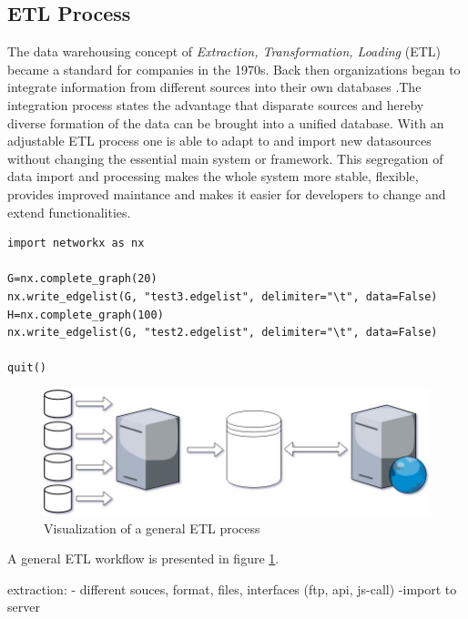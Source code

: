\documentclass[conference, 11pt]{IEEEtran}
\begin{document}
\subsection{ETL Process}
The data warehousing concept of \textit{Extraction, Transformation, Loading} (ETL) became a standard for companies in the 1970s. Back then organizations began to integrate information from different sources into their own databases \cite{carl1}.\break The integration process states the advantage that disparate sources and hereby diverse formation of the data can be brought into a unified database. With an adjustable ETL process one is able to adapt to and import new datasources without 
changing the essential main system or framework. This segregation of data import and processing makes the whole system more stable, flexible, provides improved maintance and makes it easier for developers to change and extend functionalities. %

\vspace{0.5cm}
\begin{lstlisting}
import networkx as nx

G=nx.complete_graph(20)
nx.write_edgelist(G, "test3.edgelist", delimiter="\t", data=False)
H=nx.complete_graph(100)
nx.write_edgelist(G, "test2.edgelist", delimiter="\t", data=False)

quit()
\end{lstlisting}
\vspace{0.5cm}

\break
\break
\break

\vspace{0.5cm}
\begin{figure}[htbp]
\centerline{\includegraphics[scale=0.27]{Graphics/ETL_general.png}}
\caption{Visualization of a general ETL process}
\label{fig1_ct}
\end{figure}
\vspace{0.5cm}

A general ETL workflow is presented in figure \ref{fig1_ct}.  
\iffalse

extraction:
- different souces, format, files, interfaces (ftp, api, js-call)
-import to server
\end{document}
